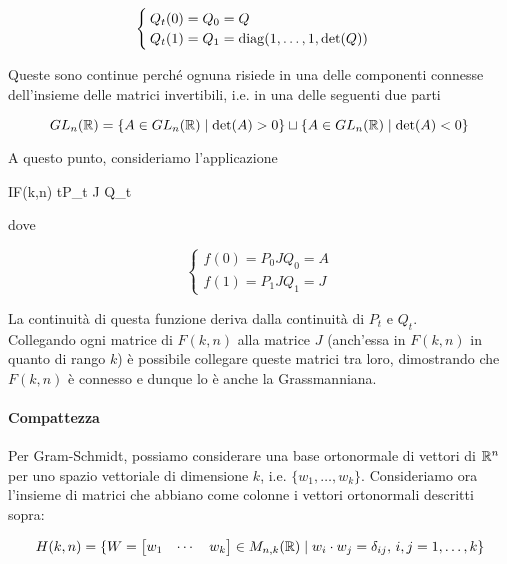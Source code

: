 {{			\begin{equation}
				\begin{cases}
					Q_{t}(0) = Q_{0} = Q \\
					Q_{t}(1) = Q_{1} = \operatorname{diag}(1,\dots,1,\det(Q))
				\end{cases}
			\end{equation}
			}

Queste sono continue perché ognuna risiede in una delle componenti connesse dell'insieme delle matrici invertibili, i.e. in una delle seguenti due parti

\begin{equation}
	GL_{n}(\mathbb{R}) = \{ A \in GL_{n}(\mathbb{R}) \mid \det(A) > 0 \} \sqcup \{ A \in GL_{n}(\mathbb{R}) \mid \det(A) < 0 \}
\end{equation}

A questo punto, consideriamo l'applicazione

	{I}{F(k,n)}
	{t}{P_{t} J Q_{t}}

dove

\begin{equation}
	\begin{cases}
		f(0) = P_{0} J Q_{0} = A \\
		f(1) = P_{1} J Q_{1} = J
	\end{cases}
\end{equation}

La continuità di questa funzione deriva dalla continuità di $ P_{t} $ e $ Q_{t} $. \\
Collegando ogni matrice di $ F(k,n) $ alla matrice $ J $ (anch'essa in $ F(k,n) $ in quanto di rango $ k $) è possibile collegare queste matrici tra loro, dimostrando che $ F(k,n) $ è connesso e dunque lo è anche la Grassmanniana.

\paragraph{Compattezza}

Per Gram-Schmidt, possiamo considerare una base ortonormale di vettori di $ \mathbb{R}^{n} $ per uno spazio vettoriale di dimensione $ k $, i.e. $ \{ w_{1}, \dots, w_{k} \} $. Consideriamo ora l'insieme di matrici che abbiano come colonne i vettori ortonormali descritti sopra:

\begin{equation}
	H(k,n) = \{ W = \bmqty{ w_{1} & \cdots & w_{k} } \in M_{n,k}(\R) \mid w_{i} \cdot w_{j} = \delta_{ij}, \, i,j = 1, \dots, k \}
\end{equation}

}
